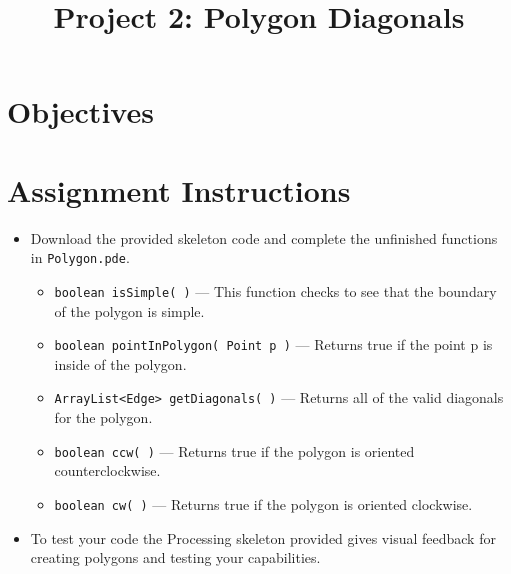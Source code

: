\documentclass[a4paper,12pt]{article}
\title{Project 2: Polygon Diagonals}
\begin{document}
\maketitle

\section{Objectives}




\projectGroundRules


\vspace{5pt}
\section{Assignment Instructions}

\begin{itemize}

\item Download the provided skeleton code and complete the unfinished functions in \texttt{Polygon.pde}.

\begin{itemize}

   \item \texttt{boolean isSimple( )} --- This function checks to see that the boundary of the polygon is simple.
   
   \item \texttt{boolean pointInPolygon( Point p )} --- Returns true if the point p is inside of the polygon.
   
   \item \texttt{ArrayList<Edge> getDiagonals( )} --- Returns all of the valid diagonals for the polygon.
   
   \item \texttt{boolean ccw( )} --- Returns true if the polygon is oriented counterclockwise.
   
   \item \texttt{boolean cw( )} --- Returns true if the polygon is oriented clockwise.
         
   
\end{itemize}

\item To test your code the Processing skeleton provided gives visual feedback for creating polygons and testing your capabilities.

\end{itemize}


\projectSubmission
\end{document}
